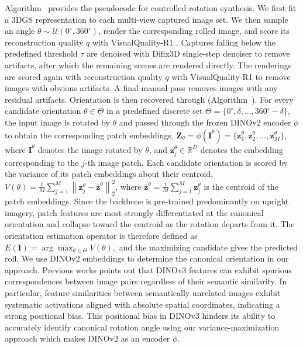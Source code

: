 



Algorithm~ provides the pseudocode for controlled rotation synthesis. We first fit a 3DGS representation to each multi-view captured image set. We then sample an angle $\theta \sim \mathcal{U}(0^\circ, 360^\circ)$, render the corresponding rolled image, and score its reconstruction quality $q$ with VisualQuality-R1 \citep{wu2026visualquality}. Captures falling below the predefined threshold $\tau$ are denoised with Difix3D single-step denoiser to remove artifacts, after which the remaining scenes are rendered directly. The renderings are scored again with reconstruction quality $q$ with VisualQuality-R1 to remove images with obvious artifacts. A final manual pass removes images with any residual artifacts.
Orientation is then recovered through (Algorithm~). For every candidate orientation $\theta\in\Theta$ in a predefined discrete set $\Theta=\{0^\circ,\delta,\ldots,360^\circ-\delta\}$, the input image is rotated by $\theta$ and passed through the frozen DINOv2 encoder $\phi$ to obtain the corresponding patch embeddings,
$\mathbf{Z}_{\theta}=\phi(\mathbf{I}^{\theta})=\{\mathbf{z}_1^\theta,\mathbf{z}_2^\theta,\ldots,\mathbf{z}_M^\theta\}$,
where $\mathbf{I}^{\theta}$ denotes the image rotated by $\theta$, and $\mathbf{z}_j^\theta\in\mathbb{R}^D$ denotes the embedding corresponding to the $j$-th image patch. Each candidate orientation is scored by the variance of its patch embeddings about their centroid,
$V(\theta)=\frac{1}{M}\sum_{j=1}^{M}\left\|\mathbf{z}_j^\theta-\bar{\mathbf{z}}^\theta\right\|_2^2$,
where $\bar{\mathbf{z}}^\theta=\frac{1}{M}\sum_{j=1}^{M}\mathbf{z}_j^\theta$ is the centroid of the patch embeddings. Since the backbone is pre-trained predominantly on upright imagery, patch features are most strongly differentiated at the canonical orientation and collapse toward the centroid as the rotation departs from it. The orientation estimation operator is therefore defined as
$
E(\mathbf{I})=\arg\max_{\theta\in\Theta}V(\theta),
$
and the maximizing candidate gives the predicted roll. We use DINOv2 embeddings to determine the canonical orientation in our approach. Previous works \citep{cuttano2026insid3} points out that DINOv3 features can exhibit spurious correspondences between image pairs regardless of their semantic similarity. In particular, feature similarities between semantically unrelated images exhibit systematic activations aligned with absolute spatial coordinates, indicating a strong positional bias. This positional bias in DINOv3 hinders its ability to accurately identify canonical rotation angle using our variance-maximization approach which makes DINOv2 as an encoder $\phi$.

